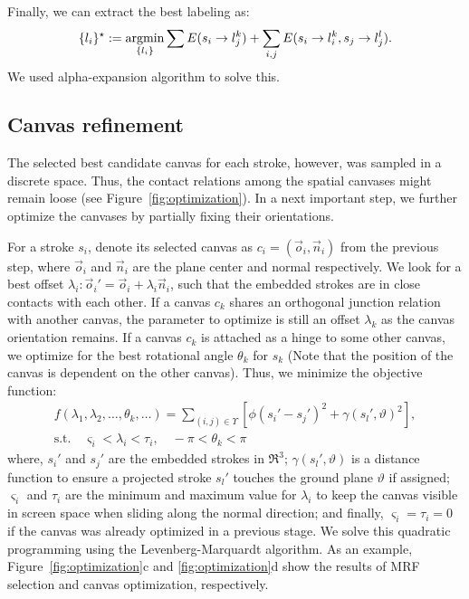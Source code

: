 Finally, we can extract the best labeling as:
\begin{equation}
\{l_i \}^\star := \operatorname*{argmin}_{ \{l_i \} } \sum E(s_i \rightarrow l_j^k) + \sum_{i,j} E(s_i \rightarrow l_i^k, s_j \rightarrow l_j^l).
\label{eqn:mrf_equation}
\end{equation}
We used alpha-expansion algorithm \cite{Kolmogorov:2004:MRF} to solve this.


\subsection{Canvas refinement}

The selected best candidate canvas for each stroke, however, was sampled in a discrete space. Thus, the contact relations among the spatial canvases might remain loose (see Figure~\ref{fig:optimization}). In a next important step, we further optimize the canvases by partially fixing their orientations.

For a stroke $s_i$, denote its selected canvas as $c_i = (\vec{o}_i, \vec{n}_i)$ from the previous step, where $\vec{o}_i$ and $\vec{n}_i$ are the plane center and normal respectively. We look for a best offset $\lambda_i: \vec{o}_i' = \vec{o}_i + \lambda_i{\vec{n}_i}$, such that the embedded strokes are in close contacts with each other. If a canvas $c_k$ shares an orthogonal junction relation with another canvas, the parameter to optimize is still an offset $\lambda_k$ as the canvas orientation remains. If a canvas $c_k$ is attached as a  hinge to some other canvas, we optimize for the best rotational angle $\theta_k$ for $s_k$ (Note that the position of the canvas is dependent on the other canvas). Thus, we minimize the objective function:
\begin{eqnarray}
f(\lambda_1, \lambda_2, \dots, \theta_k, \dots) = \sum_{(i,j) \in \Upsilon}{[\phi(s_i'-s_j')^2+\gamma(s_l',\vartheta)^2]},  \nonumber \\
\text{s.t.} \quad \varsigma_i < \lambda_i < \tau_i, \quad  -\pi < \theta_k < \pi
\label{eqn:quadratic_programming}
\end{eqnarray}
where, $s_i'$ and $s_j'$ are the embedded strokes in $\Re^3$; $\gamma(s_l',\vartheta)$ is a distance function to ensure a projected stroke $s_l'$ touches the ground plane $\vartheta$ if assigned; $\varsigma_i$ and $\tau_i$ are the minimum and maximum value for $\lambda_i$ to keep the canvas visible in screen space when sliding along the normal direction; and finally, $\varsigma_i = \tau_i = 0$ if the canvas was already optimized in a previous stage. We solve this quadratic programming using the Levenberg-Marquardt algorithm. As an example, Figure~\ref{fig:optimization}c and \ref{fig:optimization}d show the results of MRF selection and canvas optimization, respectively.

